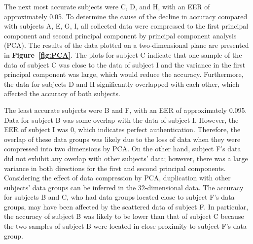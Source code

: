 \documentclass[sigconf,authordraft]{acmart}
\newcommand\figref[1]{\textbf{Figure~\ref{fig:#1}}}
\begin{document}
The next most accurate subjects were C, D, and H, with an EER of approximately 0.05. To determine the cause of the decline in accuracy compared with subjects A, E, G, I, all collected data were compressed to the first principal component and second principal component by principal component analysis (PCA). The results of the data plotted on a two-dimensional plane are presented in \figref{PCA}. The plots for subject C indicate that one sample of the data of subject C was close to the data of subject I and the variance in the first principal component was large, which would reduce the accuracy. Furthermore, the data for subjects D and H significantly overlapped with each other, which affected the accuracy of both subjects.\par

The least accurate subjects were B and F, with an EER of approximately 0.095. Data for subject B was some overlap with the data of subject I. However, the EER of subject I was 0, which indicates perfect authentication. Therefore, the overlap of these data groups was likely due to the loss of data when they were compressed into two dimensions by PCA. On the other hand, subject F's data did not exhibit any overlap with other subjects' data; however, there was a large variance in both directions for the first and second principal components. Considering the effect of data compression by PCA, duplication with other subjects' data groups can be inferred in the 32-dimensional data. The accuracy for subjects B and C, who had data groups located close to subject F's data groups, may have been affected by the scattered data of subject F. In particular, the accuracy of subject B was likely to be lower than that of subject C because the two samples of subject B were located in close proximity to subject F's data group.


\end{document}
